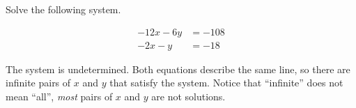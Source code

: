 
\begin{question}
Solve the following system.

\[\begin{aligned}
- 12 x - 6 y&=-108\\
- 2 x - y&=-18
\end{aligned}\]
\end{question}

\begin{solution}
The system is undetermined. Both equations describe the same line, so
there are infinite pairs of \(x\) and \(y\) that satisfy the system.
Notice that ``infinite'' does not mean ``all'', \emph{most} pairs of
\(x\) and \(y\) are not solutions.
\end{solution}

